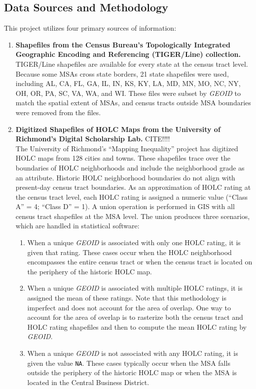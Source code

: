 \documentclass[paper=letter, fontsize=12pt]{scrartcl} %
\begin{document}
\subsection{Data Sources and Methodology}
This project utilizes four primary sources of information:
\begin{enumerate}
	\item \textbf{Shapefiles from the Census Bureau's Topologically Integrated Geographic Encoding and Referencing (TIGER/Line) collection.} \cite{tiger17}\\
	TIGER/Line shapefiles are available for every state at the census tract level. Because some MSAs cross state borders, 21 state shapefiles were used, including AL, CA, FL, GA, IL, IN, KS, KY, LA, MD, MN, MO, NC, NY, OH, OR, PA, SC, VA, WA, and WI. These files were subset by \textit{GEOID} to match the spatial extent of MSAs, and census tracts outside MSA boundaries were removed from the files.
	\item \textbf{Digitized Shapefiles of HOLC Maps from the University of Richmond's Digital Scholarship Lab.} CITE!!!! \\
	The University of Richmond's ``Mapping Inequality'' project has digitized HOLC maps from 128 cities and towns. These shapefiles trace over the boundaries of HOLC neighborhoods and include the neighborhood grade as an attribute. Historic HOLC neighborhood boundaries do not align with present-day census tract boundaries. As an approximation of HOLC rating at the census tract level, each HOLC rating is assigned a numeric value (``Class A'' = 4; ``Class D'' = 1). A union operation is performed in GIS with all census tract shapefiles at the MSA level. The union produces three scenarios, which are handled in statistical software:
	\begin{enumerate}
		\item When a unique \textit{GEOID} is associated with only one HOLC rating, it is given that rating. These cases occur when the HOLC neighborhood encompasses the entire census tract or when the census tract is located on the periphery of the historic HOLC map.
		\item When a unique \textit{GEOID} is associated with multiple HOLC ratings, it is assigned the mean of these ratings. Note that this methodology is imperfect and does not account for the area of overlap. One way to account for the area of overlap is to rasterize both the census tract and HOLC rating shapefiles and then to compute the mean HOLC rating by \textit{GEOID}.
		\item When a unique \textit{GEOID} is not associated with any HOLC rating, it is given the value \texttt{NA}. These cases typically occur when the MSA falls outside the periphery of the historic HOLC map or when the MSA is located in the Central Business District.

\end{enumerate}
\end{enumerate}
\end{document}
